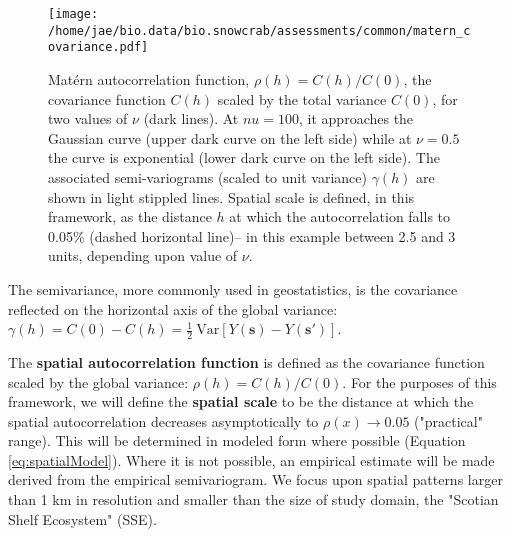 \documentclass[letterpaper,portrait,11pt]{scrartcl}
\numberwithin{equation}{section}    %
\numberwithin{figure}{section}    %
\numberwithin{table}{section}       %
\begin{document}
\begin{figure}
  \centering
  \texttt{[image: /home/jae/bio.data/bio.snowcrab/assessments/common/matern\_covariance.pdf]}
  \caption{Mat\'{e}rn autocorrelation function, $\rho(h)=C(h)/C(0)$, the covariance function $C(h)$ scaled by the total variance $C(0)$, for two values of $\nu$ (dark lines). At $nu=100$, it approaches the Gaussian curve (upper dark curve on the left side) while at $\nu=0.5$ the curve is exponential (lower dark curve on the left side). The associated semi-variograms (scaled to unit variance) $\gamma(h)$ are shown in light stippled lines. Spatial scale is defined, in this framework, as the distance $h$ at which the autocorrelation falls to 0.05\% (dashed horizontal line)-- in this example between 2.5 and 3 units, depending upon value of $\nu$.}
  \label{fig:matern_acf}
  \iffalse 
  #------------------ created by the following in an R session:
  ## plot of matern covariance
  phi = 1
  sigma = 1
  x = seq(0, 4, by=0.1)
  matern.covariance = function( sigma, nu, phi, x) { 
    1/(2^(nu-1)*gamma(nu) ) * (sqrt(2*nu)*x/phi)^nu * besselK(sqrt(2*nu)*x/phi, nu)
  }
  y = matern.covariance( sigma, nu=0.5, phi, x)
  y100 = matern.covariance( sigma, nu=100, phi, x)
  y[1]=y100[1] = sigma
  sv = sigma- y
  sv100 = sigma - y100
  
  pdf( file="~/bio.data/bio.snowcrab/assessments/common/matern_covariance.pdf")
  plot( y~x, type="l", ylim=c(0,1.05), xlab="h", ylab="", lwd=2 )
  lines( x,y100, lwd=2 )
  lines( x,sv100 , lty="dotted" )
  lines( x,sv , lty="dotted" )
  abline (h=0.05, lty="dashed")
  text ( 0.22*max(x), 0.9, "nu=100 \n ~ Gaussian" )
  text ( 0.28*max(x), 0.2,  "nu=0.5 \n ~ Exponential")
  dev.off()
  \fi
  
\end{figure}


The semivariance, more commonly used in geostatistics, is the covariance reflected on the horizontal axis of the global variance: $\gamma(h)=C(0)-C(h) = \frac{1}{2} \ \textrm{Var} [ Y(\bm{s}) - Y(\bm{s}')]$. 

The \textbf{spatial autocorrelation function} is defined as the covariance function scaled by the global variance: $\rho(h)=C(h)/C(0)$. For the purposes of this framework, we will define the \textbf{spatial scale} to be the distance at which the spatial autocorrelation decreases asymptotically to $\rho(x) \rightarrow 0.05$ ("practical" range). This will be determined in modeled form where possible (Equation \ref{eq:spatialModel}). Where it is not possible, an empirical estimate will be made derived from the empirical semivariogram. We focus upon spatial patterns larger than 1 km in resolution and smaller than the size of study domain, the "Scotian Shelf Ecosystem" (SSE). 
\end{document}
